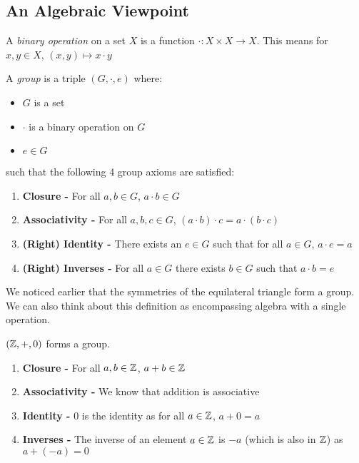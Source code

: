 \documentclass[../main.tex]{subfiles}
\begin{document}
\subsection{An Algebraic Viewpoint}
\begin{definition}
  A \textit{binary operation} on a set $X$ is a function $\cdot: X \times X \to X$.
  This means for $x, y \in X$, $(x, y) \mapsto x \cdot y$
\end{definition}
\begin{definition}[Group]
  A \textit{group} is a triple $(G, \cdot, e)$ where:
  \begin{itemize}
    \item $G$ is a set
    \item $\cdot$ is a binary operation on $G$
    \item $e \in G$
  \end{itemize}
  such that the following 4 group axioms are satisfied:
  \begin{enumerate}
    \item \textbf{Closure -} For all $a, b \in G$, $a \cdot b \in G$
    \item \textbf{Associativity -} For all $a, b, c \in G$, $(a \cdot b) \cdot c = a \cdot (b \cdot c)$
    \item \textbf{(Right) Identity -} There exists an $e \in G$ such that for all $a \in G$, $a \cdot e = a$
    \item \textbf{(Right) Inverses -} For all $a \in G$ there exists $b \in G$ such that $a \cdot b = e$
  \end{enumerate}
\end{definition}
We noticed earlier that the symmetries of the equilateral triangle form a group.
We can also think about this definition as encompassing algebra with a single operation.
\begin{example}
  $(\mathbb{Z}, +, 0)$ forms a group.
  \begin{enumerate}
    \item \textbf{Closure -} For all $a, b \in \mathbb{Z}$, $a + b \in \mathbb{Z}$ \tick
    \item \textbf{Associativity -} We know that addition is associative \tick
    \item \textbf{Identity -} 0 is the identity as for all $a \in \mathbb{Z}$, $a + 0 = a$ \tick
    \item \textbf{Inverses -} The inverse of an element $a \in \mathbb{Z}$ is $-a$ (which is also in $\mathbb{Z}$) as $a + (-a) = 0$ \tick
  \end{enumerate}
\end{example}
\end{document}

